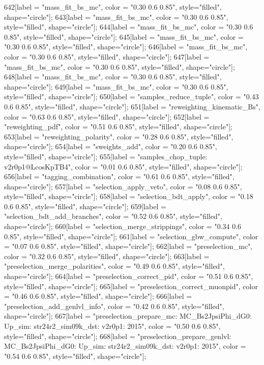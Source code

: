 {	642[label = "mass_fit_bs_mc", color = "0.30 0.6 0.85", style="filled", shape="circle"];
	643[label = "mass_fit_bs_mc", color = "0.30 0.6 0.85", style="filled", shape="circle"];
	644[label = "mass_fit_bs_mc", color = "0.30 0.6 0.85", style="filled", shape="circle"];
	645[label = "mass_fit_bs_mc", color = "0.30 0.6 0.85", style="filled", shape="circle"];
	646[label = "mass_fit_bs_mc", color = "0.30 0.6 0.85", style="filled", shape="circle"];
	647[label = "mass_fit_bs_mc", color = "0.30 0.6 0.85", style="filled", shape="circle"];
	648[label = "mass_fit_bs_mc", color = "0.30 0.6 0.85", style="filled", shape="circle"];
	649[label = "mass_fit_bs_mc", color = "0.30 0.6 0.85", style="filled", shape="circle"];
	650[label = "samples_reduce_tuple", color = "0.43 0.6 0.85", style="filled", shape="circle"];
	651[label = "reweighting_kinematic_Bs", color = "0.63 0.6 0.85", style="filled", shape="circle"];
	652[label = "reweighting_pdf", color = "0.51 0.6 0.85", style="filled", shape="circle"];
	653[label = "reweighting_polarity", color = "0.28 0.6 0.85", style="filled", shape="circle"];
	654[label = "sweights_add", color = "0.20 0.6 0.85", style="filled", shape="circle"];
	655[label = "samples_chop_tuple\nversion: v2r0p1@LcosKpTB4", color = "0.01 0.6 0.85", style="filled", shape="circle"];
	656[label = "tagging_combination", color = "0.61 0.6 0.85", style="filled", shape="circle"];
	657[label = "selection_apply_veto", color = "0.08 0.6 0.85", style="filled", shape="circle"];
	658[label = "selection_bdt_apply", color = "0.18 0.6 0.85", style="filled", shape="circle"];
	659[label = "selection_bdt_add_branches", color = "0.52 0.6 0.85", style="filled", shape="circle"];
	660[label = "selection_merge_strippings", color = "0.34 0.6 0.85", style="filled", shape="circle"];
	661[label = "selection_gbw_compute", color = "0.07 0.6 0.85", style="filled", shape="circle"];
	662[label = "preselection_mc", color = "0.32 0.6 0.85", style="filled", shape="circle"];
	663[label = "preselection_merge_polarities", color = "0.49 0.6 0.85", style="filled", shape="circle"];
	664[label = "preselection_correct_pid", color = "0.51 0.6 0.85", style="filled", shape="circle"];
	665[label = "preselection_correct_muonpid", color = "0.46 0.6 0.85", style="filled", shape="circle"];
	666[label = "preselection_add_genlvl_info", color = "0.42 0.6 0.85", style="filled", shape="circle"];
	667[label = "preselection_prepare_mc\nmode: MC_Bs2JpsiPhi_dG0\npolarity: Up\nstrip_sim: str24r2_sim09k_dst\nversion: v2r0p1\nyear: 2015", color = "0.50 0.6 0.85", style="filled", shape="circle"];
	668[label = "preselection_prepare_genlvl\nmode: MC_Bs2JpsiPhi_dG0\npolarity: Up\nstrip_sim: str24r2_sim09k_dst\nversion: v2r0p1\nyear: 2015", color = "0.54 0.6 0.85", style="filled", shape="circle"];
}
